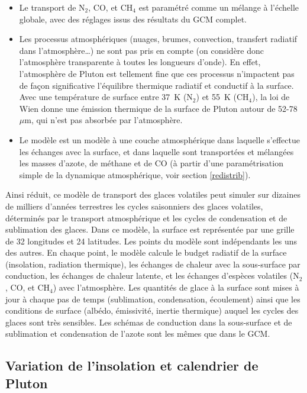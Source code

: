 \begin{itemize}
\item Le transport de N$_2$, CO, et CH$_4$ est paramétré comme un mélange à l’échelle globale, avec des réglages issus des résultats du GCM complet. 
\item Les processus atmosphériques (nuages, brumes, convection, transfert radiatif dans l’atmosphère…) ne sont pas pris en compte (on considère donc l’atmosphère transparente à toutes les longueurs d’onde). En effet, l’atmosphère de Pluton est tellement fine que ces processus n’impactent pas de façon significative l’équilibre thermique radiatif et conductif à la surface.  Avec une température de surface entre 37~K (N$_2$) et 55~K (CH$_4$), la loi de Wien donne une émission thermique de la surface de Pluton autour de 52-78~$\mu$m, qui n’est pas absorbée par l’atmosphère.
\item Le modèle est un modèle à une couche atmosphérique dans laquelle s’effectue les échanges avec la surface, et dans laquelle sont transportées et mélangées les masses d’azote, de méthane et de CO (à partir d’une paramétrisation simple de la dynamique atmosphérique, voir section \ref{redistrib}).
\end{itemize}

Ainsi réduit, ce modèle de transport des glaces volatiles peut simuler sur dizaines de milliers d’années terrestres les cycles saisonniers des glaces volatiles, déterminés par le transport atmosphérique et les cycles de condensation et de sublimation des glaces. 
Dans ce modèle, la surface est représentée par une grille de 32 longitudes et 24 latitudes. Les points du modèle sont indépendants les uns des autres. En chaque point, le modèle calcule le budget radiatif de la surface (insolation, radiation thermique), les échanges de chaleur avec la sous-surface par conduction, les échanges de chaleur latente, et les échanges d'espèces volatiles (N$_2$, CO, et CH$_4$) avec l’atmosphère. Les quantités de glace à la surface sont mises à jour à chaque pas de temps (sublimation, condensation, écoulement) ainsi que les conditions de surface (albédo, émissivité, inertie thermique) auquel les cycles des glaces sont très sensibles. 
Les schémas de conduction dans la sous-surface et de sublimation et condensation de l’azote sont les mêmes que dans le GCM. 

\subsection{Variation de l'insolation et calendrier de Pluton}


